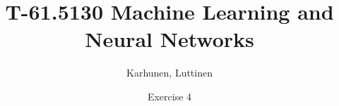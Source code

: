 \title{T-61.5130 Machine Learning and Neural Networks}
\author{Karhunen, Luttinen}
\date{Exercise 4}


\newcommand{\vect}[1]{{\bf{#1}}}
\newcommand{\svect}[1]{\boldsymbol{#1}}
\newcommand{\matr}[1]{\boldsymbol{#1}}




\maketitle

